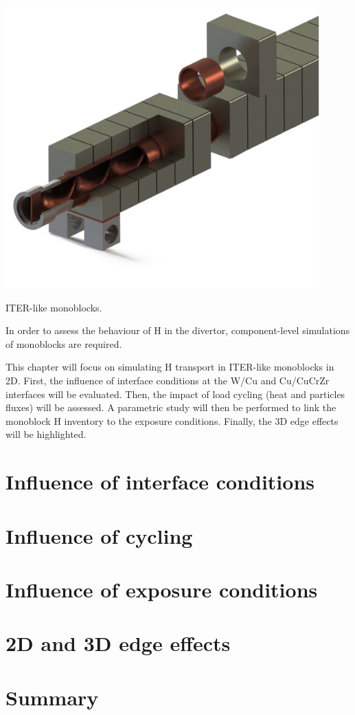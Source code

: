 \begin{marginfigure}
    \centering
    \includegraphics[width=\linewidth]{Figures/Chapter3/monoblocks_with_pipe.png}
    \caption{ITER-like monoblocks.}
    \label{fig: monoblocks with pipe}
\end{marginfigure}

In order to assess the behaviour of H in the divertor, component-level simulations of monoblocks are required.

This chapter will focus on simulating H transport in ITER-like monoblocks in 2D.
First, the influence of interface conditions at the W/Cu and Cu/CuCrZr interfaces will be evaluated.
Then, the impact of load cycling (heat and particles fluxes) will be assessed.
A parametric study will then be performed to link the monoblock H inventory to the exposure conditions.
Finally, the 3D edge effects will be highlighted.


\section{Influence of interface conditions}

\section{Influence of cycling}
\section{Influence of exposure conditions}

\section{2D and 3D edge effects}
\section{Summary}